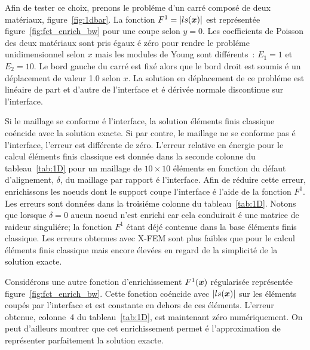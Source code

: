 


Afin de tester ce choix,
prenons le probl\'eme d'un carr\'e compos\'e de deux mat\'eriaux,
figure~\ref{fig:1dbar}. La fonction
$F^1 = |ls(\mbox{\boldmath $x$})|$ est repr\'esent\'ee
figure~\ref{fig:fct_enrich_bw} pour une coupe selon $y=0$.
Les coefficients de Poisson
des deux mat\'eriaux sont pris \'egaux \'e z\'ero pour
rendre le probl\'eme unidimensionnel selon $x$ mais
les modules de Young sont diff\'erents~:
$E_1 = 1$ et $E_2 = 10$. Le bord gauche du carr\'e
est fix\'e alors que le bord droit est soumis \'e un
d\'eplacement de valeur 1.0 selon $x$.
La solution en d\'eplacement de ce probl\'eme est lin\'eaire
de part et d'autre de l'interface et \'e
d\'eriv\'ee normale discontinue
sur l'interface.



Si le maillage se conforme \'e l'interface, la solution \'el\'ements finis
classique co\'encide avec la solution exacte. Si par contre, le
maillage ne se conforme pas \'e l'interface, l'erreur est diff\'erente
de z\'ero. L'erreur relative en \'energie pour le calcul \'el\'ements finis
classique est donn\'ee dans la seconde colonne du tableau~\ref{tab:1D}
pour un maillage de $10 \times 10$ \'el\'ements en fonction du d\'efaut
d'alignement, $\delta$, du maillage par rapport \'e l'interface. Afin
de r\'eduire cette erreur, enrichissons les noeuds dont le support
coupe l'interface \'e l'aide de la fonction $F^1$. Les erreurs sont
donn\'ees dans la troisi\'eme colonne du tableau~\ref{tab:1D}. Notons
que lorsque $\delta=0$ aucun noeud n'est enrichi car cela conduirait
\'e une matrice de raideur singuli\'ere; la fonction $F^1$ \'etant d\'ej\'e
contenue dans la base \'el\'ements finis classique. Les erreurs obtenues
avec X-FEM sont plus faibles que pour le calcul \'el\'ements finis
classique mais encore \'elev\'ees en regard de la simplicit\'e de la
solution exacte.


Consid\'erons une autre fonction
d'enrichissement $F^1(\mbox{\boldmath $x$})$ r\'egularis\'ee
repr\'esent\'ee figure~\ref{fig:fct_enrich_bw}. Cette fonction co\'encide
avec $|ls(\mbox{\boldmath $x$})|$ sur les \'el\'ements coup\'es par l'interface et est
constante en dehors de ces \'el\'ements. L'erreur 
obtenue, colonne~4 du tableau~\ref{tab:1D}, est maintenant z\'ero
num\'eriquement. On peut d'ailleurs montrer que cet enrichissement
permet \'e l'approximation de repr\'esenter parfaitement la solution
exacte.

